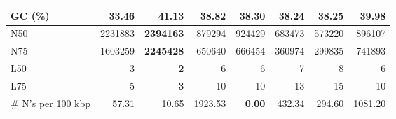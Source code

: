 \documentclass[12pt,a4paper]{article}
\begin{document}
\begin{table}[ht]
\begin{center}
\begin{tabular}{|l*{7}{|r}|}
GC (\%) & 33.46 & 41.13 & 38.82 & 38.30 & 38.24 & 38.25 & 39.98 \\ \hline
N50 & 2231883 & {\bf 2394163} & 879294 & 924429 & 683473 & 573220 & 896107 \\ \hline
N75 & 1603259 & {\bf 2245428} & 650640 & 666454 & 360974 & 299835 & 741893 \\ \hline
L50 & 3 & {\bf 2} & 6 & 6 & 7 & 8 & 6 \\ \hline
L75 & 5 & {\bf 3} & 10 & 10 & 13 & 15 & 10 \\ \hline
\# N's per 100 kbp & 57.31 & 10.65 & 1923.53 & {\bf 0.00} & 432.34 & 294.60 & 1081.20 \\ \hline
\end{tabular}
\end{center}
\end{table}
\end{document}
